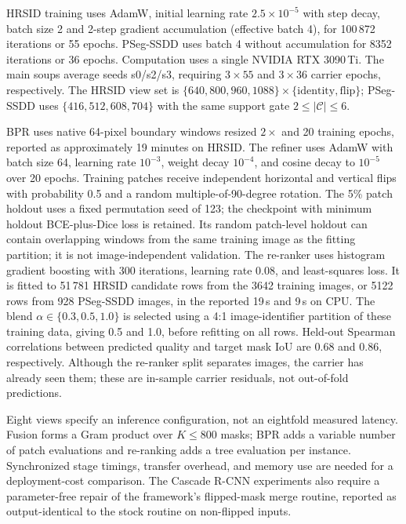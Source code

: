 HRSID training uses AdamW, initial learning rate $2.5\times10^{-5}$ with step decay, batch size 2 and 2-step gradient accumulation (effective batch 4), for 100\,872 iterations or 55 epochs. PSeg-SSDD uses batch 4 without accumulation for 8352 iterations or 36 epochs. Computation uses a single NVIDIA RTX 3090\,Ti. The main soups average seeds s0/s2/s3, requiring $3\times55$ and $3\times36$ carrier epochs, respectively. The HRSID view set is $\{640,800,960,1088\}\times\{\mathrm{identity},\mathrm{flip}\}$; PSeg-SSDD uses $\{416,512,608,704\}$ with the same support gate $2\le|\mathcal C|\le6$.

BPR uses native 64-pixel boundary windows resized $2\times$ and 20 training epochs, reported as approximately 19 minutes on HRSID. The refiner uses AdamW with batch size 64, learning rate $10^{-3}$, weight decay $10^{-4}$, and cosine decay to $10^{-5}$ over 20 epochs. Training patches receive independent horizontal and vertical flips with probability 0.5 and a random multiple-of-90-degree rotation. The 5\% patch holdout uses a fixed permutation seed of 123; the checkpoint with minimum holdout BCE-plus-Dice loss is retained. Its random patch-level holdout can contain overlapping windows from the same training image as the fitting partition; it is not image-independent validation. The re-ranker uses histogram gradient boosting with 300 iterations, learning rate 0.08, and least-squares loss. It is fitted to 51\,781 HRSID candidate rows from the 3642 training images, or 5122 rows from 928 PSeg-SSDD images, in the reported 19\,s and 9\,s on CPU. The blend $\alpha\in\{0.3,0.5,1.0\}$ is selected using a 4:1 image-identifier partition of these training data, giving 0.5 and 1.0, before refitting on all rows. Held-out Spearman correlations between predicted quality and target mask IoU are 0.68 and 0.86, respectively. Although the re-ranker split separates images, the carrier has already seen them; these are in-sample carrier residuals, not out-of-fold predictions.

Eight views specify an inference configuration, not an eightfold measured latency. Fusion forms a Gram product over $K\le800$ masks; BPR adds a variable number of patch evaluations and re-ranking adds a tree evaluation per instance. Synchronized stage timings, transfer overhead, and memory use are needed for a deployment-cost comparison. The Cascade R-CNN experiments also require a parameter-free repair of the framework's flipped-mask merge routine, reported as output-identical to the stock routine on non-flipped inputs.

